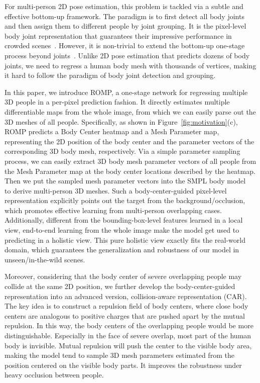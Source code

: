 \documentclass[10pt,twocolumn,letterpaper]{article}
\begin{document}
For multi-person 2D pose estimation, this problem is tackled via a subtle and effective bottom-up framework. The paradigm is to first detect all body joints and then assign them to different people by joint grouping. It is the pixel-level body joint representation that guarantees their impressive performance in crowded scenes~\cite{openpose,cheng2020bottom,pishchulin2016deepcut}. 
However, it is non-trivial to extend the bottom-up one-stage process beyond joints~\cite{jiang2020coherent}.
Unlike 2D pose estimation that predicts dozens of body joints, we need to regress a human body mesh with thousands of vertices, making it hard to follow the paradigm of body joint detection and grouping.

In this paper, we introduce ROMP, a one-stage network for regressing multiple 3D people in a per-pixel prediction fashion.
It directly estimates multiple differentiable maps from the whole image, from which we can easily parse out the 3D meshes of all people.
Specifically, as shown in Figure~\ref{fig:motivation}(c), ROMP predicts a Body Center heatmap and a Mesh Parameter map, representing the 2D position of the body center and the parameter vectors of the corresponding 3D body mesh, respectively.
Via a simple parameter sampling process, we can easily extract 3D body mesh parameter vectors of all people from the Mesh Parameter map at the body center locations described by the heatmap. 
Then we put the sampled mesh parameter vectors into the SMPL body model~\cite{SMPL} to derive multi-person 3D meshes.
Such a body-center-guided pixel-level representation explicitly points out the target from the background/occlusion, which promotes effective learning from multi-person overlapping cases. 
Additionally, different from the bounding-box-level features learned in a local view, end-to-end learning from the whole image make the model get used to predicting in a holistic view.
This pure holistic view exactly fits the real-world domain, which guarantees the generalization and robustness of our model in unseen/in-the-wild scenes.

Moreover, considering that the body center of severe overlapping people may collide at the same 2D position, we further develop the body-center-guided representation into an advanced version, collision-aware representation (CAR). The key idea is to construct a repulsion field of body centers, where close body centers are analogous to positive charges that are pushed apart by the mutual repulsion. In this way, the body centers of the overlapping people would be more distinguishable. Especially in the face of severe overlap, most part of the human body is invisible. Mutual repulsion will push the center to the visible body area, making the model tend to sample 3D mesh parameters estimated from the position centered on the visible body parts. It improves the robustness under heavy occlusion between people. 
\end{document}
